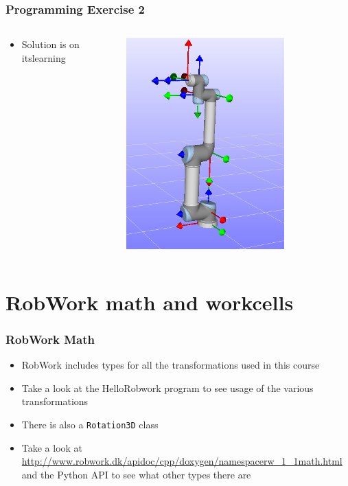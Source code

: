 \documentclass{beamer}
\begin{document}
\begin{frame}
  \frametitle{Programming Exercise 2}
  \begin{columns}
    \begin{column}{0.6\textwidth}
      \begin{itemize}
      \item Solution is on itslearning
      \end{itemize}
    \end{column}
    \begin{column}{0.4\textwidth}
      \begin{centering}
        \includegraphics[width=0.7\textwidth]{./graphics/ex33_sol}
      \end{centering}
    \end{column}
  \end{columns}
\end{frame}


\section{RobWork math and workcells}


\begin{frame}
  \frametitle{RobWork Math}
  \begin{itemize}
  \item RobWork includes types for all the transformations used in this course
  \item Take a look at the HelloRobwork program to see usage of the various transformations
  \item There is also a \texttt{Rotation3D} class
  \item Take a look at \url{http://www.robwork.dk/apidoc/cpp/doxygen/namespacerw_1_1math.html} and the Python API to see what other types there are
  \end{itemize}
\end{frame}
\end{document}
